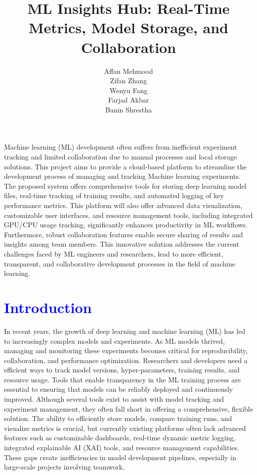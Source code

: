 \documentclass[12pt]{article}
\newcommand{\tb}{\textcolor{blue}}
\begin{document}
\title{ML Insights Hub: Real-Time Metrics, Model Storage, and Collaboration}


\author{
Affan Mehmood\\
Zifan Zhang\\
Wenyu Fang\\
Farjad Akbar\\
Banin Shrestha\\
}




\maketitle {}

\abstract Machine learning (ML) development often suffers from inefficient experiment tracking and limited collaboration due to manual processes and local storage solutions. This project aims to provide a cloud-based platform to streamline the development process of managing and tracking Machine learning experiments. The proposed system offers comprehensive tools for storing deep learning model files, real-time tracking of training results, and automated logging of key performance metrics. This platform will also offer advanced data visualization, customizable user interfaces, and resource management tools, including integrated GPU/CPU usage tracking, significantly enhances productivity in ML workflows. Furthermore, robust collaboration features enable secure sharing of results and insights among team members. This innovative solution addresses the current challenges faced by ML engineers and researchers, lead to more efficient, transparent, and collaborative development processes in the field of machine learning.

\section{\tb{Introduction}}

In recent years, the growth of deep learning and machine learning (ML) has led to increasingly complex models and experiments. As ML models thrived, managing and monitoring these experiments becomes critical for reproducibility, collaboration, and performance optimization. Researchers and developers need a efficient ways to track model versions, hyper-parameters, training results, and resource usage. Tools that enable transparency in the ML training process are essential to ensuring that models can be reliably deployed and continuously improved. 
Although several tools exist to assist with model tracking and experiment management, they often fall short in offering a comprehensive, flexible solution. The ability to efficiently store models, compare training runs, and visualize metrics is crucial, but currently existing platforms often lack advanced features such as customizable dashboards, real-time dynamic metric logging, integrated explainable AI (XAI) tools, and resource management capabilities. These gaps create inefficiencies in model development pipelines, especially in large-scale projects involving teamwork.
\end{document}
